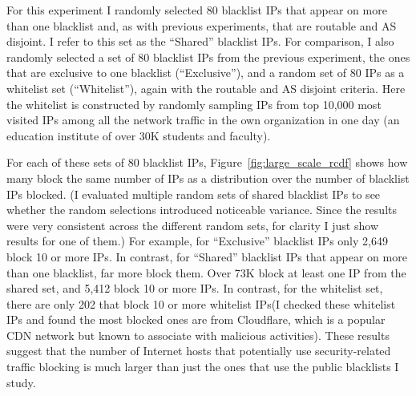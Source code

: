 
For this experiment I randomly selected 80 blacklist IPs that appear
on more than one blacklist and, as with previous experiments, that are
routable and AS disjoint.  I refer to this set as the ``Shared''
blacklist IPs.  For comparison, I also randomly selected a set of 80
blacklist IPs from the previous experiment, the ones that are
exclusive to one blacklist (``Exclusive''), and a random set of 80 IPs
as a whitelist set (``Whitelist''), again with the routable and AS disjoint
criteria. Here the whitelist is constructed by randomly sampling IPs
from top 10,000 most visited IPs among all the network traffic in the own
organization in one day (an education institute of over 30K students
and faculty).



For each of these sets of 80 blacklist IPs,
Figure~\ref{fig:large_scale_rcdf} shows how many {} block
the same number of IPs as a distribution over the number of blacklist
IPs blocked.  (I evaluated multiple random sets of shared blacklist
IPs to see whether the random selections introduced noticeable
variance.  Since the results were very consistent across the different
random sets, for clarity I just show results for one of them.)  For
example, for ``Exclusive'' blacklist IPs only 2,649 {}
block 10 or more IPs.  In contrast, for ``Shared'' blacklist IPs that
appear on more than one blacklist, far more {} block them.
Over 73K {} block at least one IP from the shared set, and
5,412 {} block 10 or more IPs.  In contrast, for the
whitelist set, there are only 202 {} that block 10 or more
whitelist IPs(I checked these whitelist IPs and found the most blocked
ones are from Cloudflare, which is a popular CDN network but
known to associate with malicious activities).
These results suggest that the number of Internet
hosts that potentially use security-related traffic blocking is much
larger than just the ones that use the public blacklists I study.


